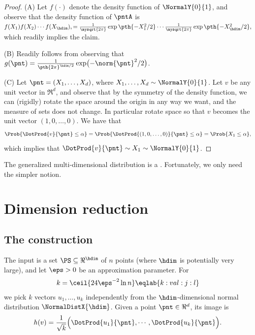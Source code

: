 \begin{proof}
    (A) Let $f(\cdot)$ denote the density function of
    $\NormalY{0}{1}$, and observe that the density function of $\pntA$ is
    \begin{math}
        f(X_1) f(X_2) \cdots f(X_\hdim),
        = %
        \frac{1}{\mysqrt{2\pi}} \exp \pth{ -X_1^2/2}
        \cdots
        \frac{1}{\mysqrt{2\pi}} \exp \pth{ -X_\hdim^2/2},
    \end{math}
    which readily implies the claim.

    
    (B) Readily follows from observing that
    $g(\pnt)=\frac{1}{\pth{2\pi}^{\hdim/2} } \exp\bigl( -
    \norm{\pnt}^2/2\bigr)$. 

    (C) Let $\pnt = (X_1, \ldots, X_d)$, where
    $X_1,\ldots, X_d \sim \NormalY{0}{1}$.  Let $v$ be any unit vector
    in $\Re^d$, and observe that by the symmetry of the density
    function, we can (rigidly) rotate the space around the origin in
    any way we want, and the measure of sets does not change. In
    particular rotate space so that $v$ becomes the unit vector
    $(1,0,\ldots, 0)$. We have that
    \begin{equation*}
        \Prob{ \DotProd{v}{\pnt} \leq \alpha}%
        =%
        \Prob{ \DotProd{(1, 0, \ldots, 0)}{\pnt} \leq \alpha}%
        =%
        \Prob{ X_1 \leq \alpha},
    \end{equation*}
    which implies that
    $\DotProd{v}{\pnt} \sim X_1 \sim \NormalY{0}{1}$. 
\end{proof}

The generalized multi-dimensional distribution is a
. Fortunately, we only need the simpler notion.



\section{Dimension reduction}

\subsection{The construction}

The input is a set $\PS \subseteq \Re^\hdim$ of $n$ points (where
$\hdim$ is potentially very large), and let $\eps >0$ be an
approximation parameter. For
\begin{equation}
    k = \ceil{24\eps^{-2} \ln n}
    \eqlab{k:val:j:l}%
\end{equation}
we pick $k$ vectors $u_1, \ldots, u_k$ independently from the
$\hdim$-dimensional normal distribution $\NormalDistX{\hdim}$. Given a
point $\pnt \in \Re^d$, its image is
\begin{equation*}
    h(v)%
    =%
    \frac{1}{\sqrt{k}} \Bigl( \DotProd{u_1}{\pnt}, \cdots,
    \DotProd{u_k}{\pnt} \Bigr).     
\end{equation*}

